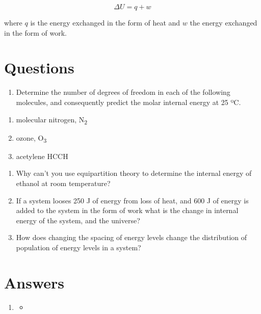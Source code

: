 \documentclass[
]{book}
\providecommand{\tightlist}{%
  \setlength{\itemsep}{0pt}\setlength{\parskip}{0pt}}
\begin{document}
\begin{equation}
\Delta U = q + w
\label{eq:firstlaw}
\end{equation}

where \(q\) is the energy exchanged in the form of heat and \(w\) the energy exchanged in the form of work.

\hypertarget{questions}{%
\section{Questions}\label{questions}}

\begin{enumerate}
\def\labelenumi{\arabic{enumi}.}
\tightlist
\item
  Determine the number of degrees of freedom in each of the following molecules, and consequently predict the molar internal energy at 25 ºC.
\end{enumerate}

\begin{enumerate}
\def\labelenumi{\alph{enumi}.}
\tightlist
\item
  molecular nitrogen, N\textsubscript{2}
\item
  ozone, O\textsubscript{3}
\item
  acetylene HCCH
\end{enumerate}

\begin{enumerate}
\def\labelenumi{\arabic{enumi}.}
\setcounter{enumi}{1}
\item
  Why can't you use equipartition theory to determine the internal energy of ethanol at room temperature?
\item
  If a system looses 250 J of energy from loss of heat, and 600 J of energy is added to the system in the form of work what is the change in internal energy of the system, and the universe?
\item
  How does changing the spacing of energy levels change the distribution of population of energy levels in a system?
\end{enumerate}

\hypertarget{answers}{%
\section{Answers}\label{answers}}

\begin{enumerate}
\def\labelenumi{\arabic{enumi}.}
\item
  \begin{itemize}
  \item
  \end{itemize}
\end{enumerate}
\end{document}
